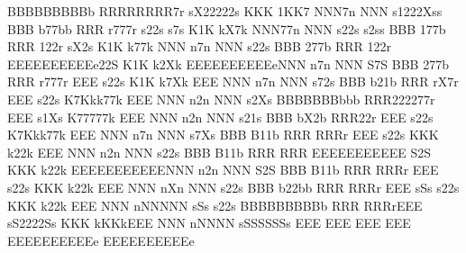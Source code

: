 \documentclass[landscape]{article}
\begin{document}
\begin{iamjatex}
BBBBBBBBBb     RRRRRRRR7r         	   sX22222s   KKK      1KK7	      NNN7n           NNN   s1222Xss  
BBB    b77bb   RRR    r777r		  s22s	  s7s K1K     kX7k	      NNN77n	      NNN  s22s	  s2ss
BBB	 177b  RRR	122r		 sX2s	      K1K    k77k	      NNN n7n	      NNN s22s	      
BBB	  277b RRR	 122r EEEEEEEEEEe22S	      K1K   k2Xk   EEEEEEEEEEeNNN  n7n	      NNN S7S	      
BBB	 277b  RRR	r777r EEE	  s22s	      K1K  k7Xk	   EEE	      NNN   n7n	      NNN  s72s	      
BBB	b21b   RRR     rX7r   EEE	   s22s	      K7Kkk77k	   EEE	      NNN    n2n      NNN   s2Xs      
BBBBBBBbbb     RRR222277r     EEE	     s1Xs     K77777k	   EEE	      NNN     n2n     NNN     s21s   
BBB	bX2b   RRR22r	      EEE	       s22s   K7Kkk77k	   EEE	      NNN      n7n    NNN	s7Xs  
BBB	 B11b  RRR  RRRr      EEE		s22s  KKK  k22k	   EEE	      NNN	n2n   NNN	 s22s 
BBB	  B11b RRR    RRR     EEEEEEEEEEE	 S2S  KKK   k22k   EEEEEEEEEEENNN	 n2n  NNN	  S2S 
BBB	 B11b  RRR     RRRr   EEE		s22s  KKK    k22k  EEE	      NNN	  nXn NNN	 s22s 
BBB    b22bb   RRR	RRRr  EEE	 sSs   s22s   KKK     k22k EEE	      NNN	   nNNNNN sSs	s22s  
BBBBBBBBBb     RRR	  RRRrEEE	  sS2222Ss    KKK      kKKkEEE	      NNN	    nNNNN  sSSSSSSs   
          		      EEE				   EEE	      
         		      EEE				   EEE	      
			      EEEEEEEEEEe			   EEEEEEEEEEe
\end{iamjatex}
\end{document}
